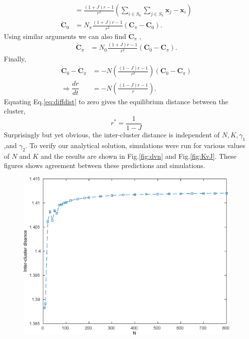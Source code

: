 \documentclass[twocolumn,10pt]{asme2ej}
\begin{document}
{{\begin{align}
            &= \frac{(1+J) r - 1}{r^2} \left(\sum_{i \in S_0} \sum_{j \in S_\pi} \mathbf{x}_j - \mathbf{x}_i\right) \nonumber\\
            \dot{\mathbf{C}}_0 &= N_\pi \frac{(1+J) r - 1}{r^2} (\mathbf{C}_\pi - \mathbf{C}_0). 
        \end{align}
        Using similar arguments we can also find \(\dot{\mathbf{C}}_\pi\) ,
        \begin{align}
            \dot{\mathbf{C}}_\pi &= N_0 \frac{(1+J) r - 1}{r^2} (\mathbf{C}_0 - \mathbf{C}_\pi).
        \end{align}
        Finally,
        \begin{align}
            \dot{\mathbf{C}}_0 - \dot{\mathbf{C}}_\pi &= -N \left(\frac{(1-J)r -1}{r^2}\right)(\mathbf{C}_0 - \mathbf{C}_\pi) \nonumber \\
            \Rightarrow \dfrac{dr}{dt} &= -N \left(\frac{(1-J)r -1}{r}\right). \label{eq:diffdist}
        \end{align}
        Equating Eq.\ref*{eq:diffdist} to zero gives the equilibrium distance between the cluster,
        \begin{equation}\label{eq:eqdist}
            r^* = \frac{1}{1-J}
        \end{equation} %
        Surprisingly but yet obvious, the inter-cluster distance is independent of \(N,K,\gamma_1\),and \(\gamma_2\). To verify our analytical solution, simulations were run for various values of \(N\) and \(K\) and the results are shown in Fig.\ref{fig:dvn} and Fig.\ref{fig:KvJ}. These figures shows agreement between these predictions and simulations. 
        \begin{figure}[h!]
            \includegraphics[width = \linewidth]{dvn.eps}

\end{figure}}}
\end{document}
